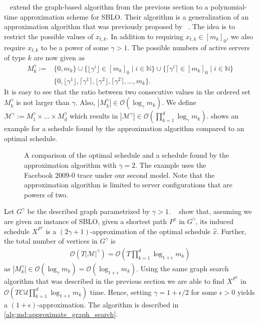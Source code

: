 \citeauthor*{Albers2021_2}~\cite{Albers2021_2} extend the graph-based algorithm from the previous section to a polynomial-time approximation scheme for SBLO. Their algorithm is a generalization of an approximation algorithm that was previously proposed by \citeauthor*{Kappelmann2017}~\cite{Kappelmann2017}. The idea is to restrict the possible values of $x_{t,k}$. In addition to requiring $x_{t,k} \in [m_k]_0$, we also require $x_{t,k}$ to be a power of some $\gamma > 1$. The possible numbers of active servers of type $k$ are now given as \begin{align*}
    M_k^{\gamma} := &\{0, m_k\} \cup \{\lfloor\gamma^i\rfloor \in [m_k]_0 \mid i \in \mathbb{N}\} \cup \{\lceil\gamma^i\rceil \in [m_k]_0 \mid i \in \mathbb{N}\} \\
                    &\{0, \lfloor\gamma^1\rfloor, \lceil\gamma^1\rceil, \lfloor\gamma^2\rfloor, \lceil\gamma^2\rceil, \dots, m_k\}.
\end{align*} It is easy to see that the ratio between two consecutive values in the ordered set $M_k^{\gamma}$ is not larger than $\gamma$. Also, $|M_k^{\gamma}| \in \mathcal{O}(\log_{\gamma} m_k)$. We define $\mathcal{M}^{\gamma} := M_1^{\gamma} \times \dots \times M_d^{\gamma}$ which results in $|\mathcal{M}^{\gamma}| \in \mathcal{O}(\prod_{k=1}^d \log_{\gamma} m_k)$.  shows an example for a schedule found by the approximation algorithm compared to an optimal schedule.

\begin{figure}
    \centering
    
    \caption{A comparison of the optimal schedule and a schedule found by the approximation algorithm with $\gamma = 2$. The example uses the Facebook 2009-0 trace under our second model. Note that the approximation algorithm is limited to server configurations that are powers of two.}
    \label{fig:a_schedule_found_by_the_multi_dimensional_integral_offline_approximation_algorithm}
\end{figure}

Let $G^{\gamma}$ be the described graph parametrized by $\gamma > 1$. \citeauthor*{Albers2021_2}~\cite{Albers2021_2} show that, assuming we are given an instance of SBLO, given a shortest path $P^{\gamma}$ in $G^{\gamma}$, its induced schedule $X^{P^{\gamma}}$ is a $(2\gamma + 1)$-approximation of the optimal schedule $\hat{x}$. Further, the total number of vertices in $G^{\gamma}$ is \begin{align*}
    \mathcal{O}(T |\mathcal{M}|^{\gamma}) = \mathcal{O}(T \prod_{k=1}^d \log_{1+\epsilon} m_k)
\end{align*} as $|M_k^{\gamma}| \in \mathcal{O}(\log_{\gamma} m_k) = \mathcal{O}(\log_{1 + \epsilon} m_k)$. Using the same graph search algorithm that was described in the previous section we are able to find $X^{P^{\gamma}}$ in $\mathcal{O}(T C d \prod_{k=1}^d \log_{1 + \epsilon} m_k)$ time. Hence, setting $\gamma = 1 + \epsilon / 2$ for some $\epsilon > 0$ yields a $(1+\epsilon)$-approximation. The algorithm is described in \cref{alg:md:approximate_graph_search}.

